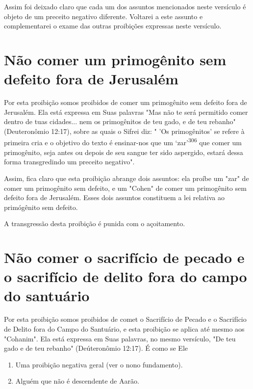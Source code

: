 \begin{itemize}
\begin{enumrate}
\begin{itemize}
\begin{itemize}
\begin{itemize}
Assim foi deixado claro que cada um dos assuntos mencionados neste
versículo é objeto de um preceito negativo diferente. Voltarei a este
assunto e complementarei o exame das outras proibições expressas neste
versículo.

\section{Não comer um primogênito sem defeito fora de Jerusalém}

Por esta proibição somos proibidos de comer um primogênito sem defeito
fora de Jerusalém. Ela está expressa em Suas palavras "Mas não te será
permitido comer dentro de tuas cidades... nem os primogênitos de teu
gado, e de teu rebanho" (Deuteronômio 12:17), sobre as quais o Sifrei
diz: " 'Os pri­mogênitos' se refere à primeira cria e o objetivo do
texto é ensinar-nos que um `zar'\textsuperscript{306} que comer um
primogênito, seja antes ou depois de seu sangue ter sido aspergido,
estará dessa forma transgredindo um preceito negativo".

Assim, fica claro que esta proibição abrange dois assuntos: ela proí­be
um "zar" de comer um primogênito sem defeito, e um "Cohen" de comer um
primogênito sem defeito fora de Jerusalém. Esses dois assuntos
constituem a lei relativa ao primógênito sem defeito.

A transgressão desta proibição é punida com o açoitamento.

\section{Não comer o sacrifício de pecado e o sacrifício de delito fora 
do campo do santuário}

Por esta proibição somos proibidos de comet o Sacrifício de Pecado e o
Sacrifício de Delito fora do Campo do Santuário, e esta proibição se
aplica até mesmo aos "Cohanim". Ela está expressa em Suas palavras, no
mesmo ver­sículo, "De teu gado e de teu rebanho" (Deúteronômio 12:17). É
como se Ele


\begin{enumerate}
\def\labelenumi{\arabic{enumi}.}
\setcounter{enumi}{304}
\item
 
 Uma proibição negativa geral (ver o nono fundamento).
 
\item
 
 Alguém que não é descendente de Aarão.
 

\end{enumerate}
\end{itemize}
\end{itemize}
\end{itemize}
\end{enumrate}
\end{itemize}
